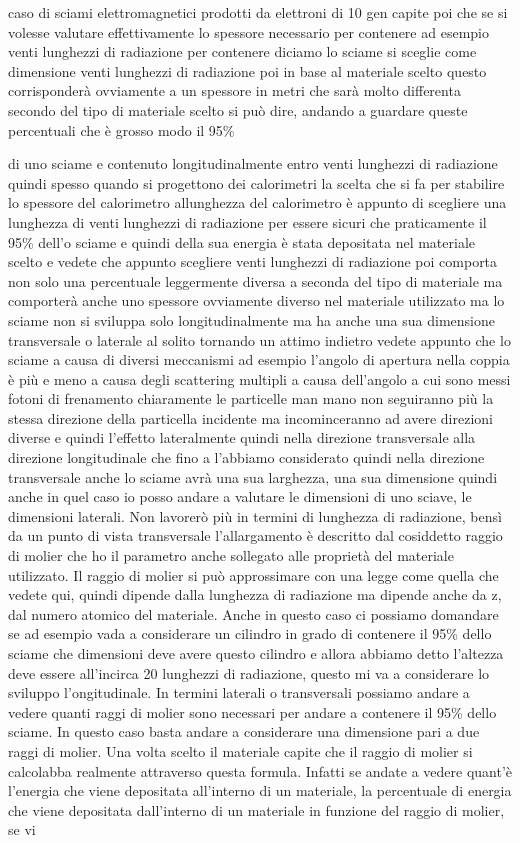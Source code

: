 {caso di sciami elettromagnetici prodotti da elettroni di 10 gen capite poi che se si volesse valutare effettivamente lo spessore necessario per contenere ad esempio venti lunghezzi di radiazione per contenere diciamo lo sciame si sceglie come dimensione venti lunghezzi di radiazione poi in base al materiale scelto questo corrisponderà ovviamente a un spessore in metri che sarà molto differenta secondo del tipo di materiale scelto si può dire, andando a guardare queste percentuali che è grosso modo il 95\% 

di uno sciame e contenuto longitudinalmente entro venti lunghezzi di radiazione quindi spesso quando si progettono dei calorimetri la scelta che si fa per stabilire lo spessore del calorimetro allunghezza del calorimetro è appunto di scegliere una lunghezza di venti lunghezzi di radiazione per essere sicuri che praticamente il 95\% dell'o sciame e quindi della sua energia è stata depositata nel materiale scelto e vedete che appunto scegliere venti lunghezzi di radiazione poi comporta non solo una percentuale leggermente diversa a seconda del tipo di materiale ma comporterà anche uno spessore ovviamente diverso nel materiale utilizzato ma lo sciame non si sviluppa solo longitudinalmente ma ha anche una sua dimensione transversale o laterale al solito tornando un attimo indietro vedete appunto che lo sciame a causa di diversi meccanismi ad esempio l'angolo di apertura nella coppia è più e meno a causa degli scattering multipli a causa dell'angolo a cui sono messi fotoni di frenamento chiaramente le particelle man mano non seguiranno più la stessa direzione della particella incidente ma incominceranno ad avere direzioni diverse e quindi l'effetto lateralmente quindi nella direzione transversale alla direzione longitudinale che fino a l'abbiamo considerato quindi nella direzione transversale anche lo sciame avrà una sua larghezza, una sua dimensione quindi anche in quel caso io posso andare a valutare le dimensioni di uno sciave, le dimensioni laterali. Non lavorerò più in termini di lunghezza di radiazione, bensì da un punto di vista transversale l'allargamento è descritto dal cosiddetto raggio di molier che ho il parametro anche sollegato alle proprietà del materiale utilizzato. Il raggio di molier si può approssimare con una legge come quella che vedete qui, quindi dipende dalla lunghezza di radiazione ma dipende anche da z, dal numero atomico del materiale. Anche in questo caso ci possiamo domandare se ad esempio vada a considerare un cilindro in grado di contenere il 95\% dello sciame che dimensioni deve avere questo cilindro e allora abbiamo detto l'altezza deve essere all'incirca 20 lunghezzi di radiazione, questo mi va a considerare lo sviluppo l'ongitudinale. In termini laterali o transversali possiamo andare a vedere quanti raggi di molier sono necessari per andare a contenere il 95\% dello sciame. In questo caso basta andare a considerare una dimensione pari a due raggi di molier. Una volta scelto il materiale capite che il raggio di molier si calcolabba realmente attraverso questa formula. Infatti se andate a vedere quant'è l'energia che viene depositata all'interno di un materiale, la percentuale di energia che viene depositata dall'interno di un materiale in funzione del raggio di molier, se vi }
